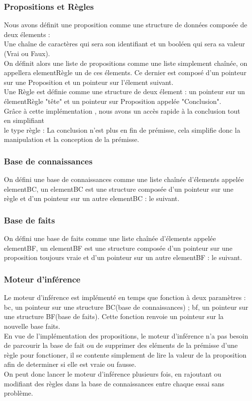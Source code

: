 \documentclass{article}
\begin{document}
\subsubsection{Propositions et Règles}
Nous avons définit une proposition comme une structure de données composée de deux élements :\\ Une chaîne de caractères qui sera son identifiant et un booléen qui sera sa valeur (Vrai ou Faux).\\
On définit alors une liste de propositions comme une liste simplement chaînée, on appellera elementRègle un de ces élements. Ce dernier est composé d'un pointeur sur une Proposition et un pointeur sur l'élement suivant.\\
Une Règle est définie comme une structure de deux élement : un pointeur sur un élementRègle "tête" et un pointeur sur Proposition appelée "Conclusion".\\
Grâce à cette implémentation , nous avons un accès rapide à la conclusion tout en simplifiant \\le type règle : La conclusion n'est plus en fin de prémisse, cela simplifie donc la manipulation et la conception de la prémisse.

\subsubsection{Base de connaissances}
On défini une base de connaissances comme une liste chaînée d'élements appelée elementBC, un elementBC est une structure composée d'un pointeur sur une règle et d'un pointeur sur un autre elementBC : le suivant.

\subsubsection{Base de faits}
On défini une base de faits comme une liste chaînée d'élements appelée elementBF, un elementBF est une structure composée d'un pointeur sur une proposition toujours vraie et d'un pointeur sur un autre elementBF : le suivant.

\subsubsection{Moteur d'inférence}
Le moteur d'inférence est implémenté en temps que fonction à deux paramètres : bc, un pointeur sur une structure BC(base de connaissances) ; bf, un pointeur sur une structure BF(base de faits).
Cette fonction renvoie un pointeur sur la nouvelle base faits.\\
En vue  de l'implémentation des propositions, le moteur d'inférence n'a pas besoin de parcourir la base de fait ou de supprimer des eléments de la prémisse d'une règle pour fonctioner, il se contente simplement de lire la valeur de la proposition afin de determiner si elle est vraie ou fausse.\\
On peut donc  lancer le moteur d'inférence plusieurs fois,  en rajoutant ou modifiant des règles dans la base de connaissances entre chaque essai sans problème.
\end{document}

